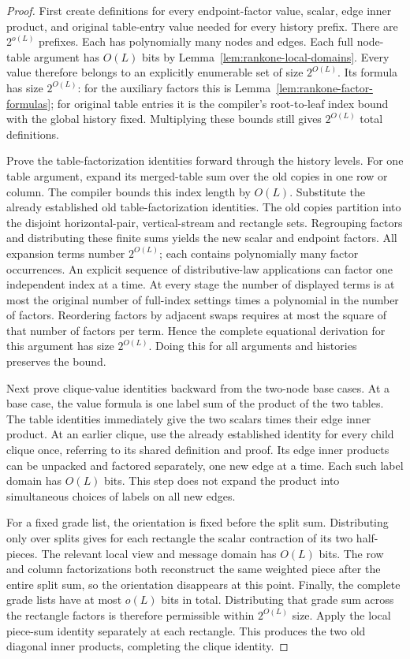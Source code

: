 \documentclass[11pt]{article}
\theoremstyle{definition}
\theoremstyle{remark}
\begin{document}
\begin{proof}
First create definitions for every endpoint-factor value, scalar,
edge inner product, and original table-entry value needed for
every history prefix. There are $2^{o(L)}$ prefixes. Each has
polynomially many nodes and edges. Each full node-table argument
has $O(L)$ bits by Lemma~\ref{lem:rankone-local-domains}.
Every value therefore belongs to an explicitly enumerable set of
size $2^{O(L)}$. Its formula has size $2^{O(L)}$:
for the auxiliary factors this is
Lemma~\ref{lem:rankone-factor-formulas}; for original table
entries it is the compiler's root-to-leaf index bound with the
global history fixed. Multiplying these bounds still gives
$2^{O(L)}$ total definitions.

Prove the table-factorization identities forward through the
history levels. For one table argument, expand its merged-table
sum over the old copies in one row or column. The compiler bounds
this index length by $O(L)$. Substitute the already established
old table-factorization identities. The old copies partition into
the disjoint horizontal-pair, vertical-stream and rectangle sets.
Regrouping factors and distributing these finite sums yields the
new scalar and endpoint factors. All expansion terms number
$2^{O(L)}$; each contains polynomially many factor occurrences.
An explicit sequence of distributive-law applications can factor
one independent index at a time. At every stage the number of
displayed terms is at most the original number of full-index
settings times a polynomial in the number of factors. Reordering
factors by adjacent swaps requires at most the square of that
number of factors per term. Hence the complete equational
derivation for this argument has size $2^{O(L)}$.
Doing this for all arguments and histories preserves the bound.

Next prove clique-value identities backward from the two-node
base cases. At a base case, the value formula is one label sum of
the product of the two tables. The table identities immediately
give the two scalars times their edge inner product. At an
earlier clique, use the already established identity for every
child clique once, referring to its shared definition and proof.
Its edge inner products can be unpacked and factored separately,
one new edge at a time. Each such label domain has $O(L)$ bits.
This step does not expand the product into simultaneous choices
of labels on all new edges.

For a fixed grade list, the orientation is fixed before the split
sum. Distributing only over splits gives for each rectangle the
scalar contraction of its two half-pieces. The relevant local
view and message domain has $O(L)$ bits. The row and column
factorizations both reconstruct the same weighted piece after
the entire split sum, so the orientation disappears at this
point. Finally, the complete grade lists have at most $o(L)$
bits in total. Distributing that grade sum across the rectangle
factors is therefore permissible within $2^{O(L)}$ size.
Apply the local piece-sum identity separately at each rectangle.
This produces the two old diagonal inner products, completing
the clique identity.


\end{proof}
\end{document}
